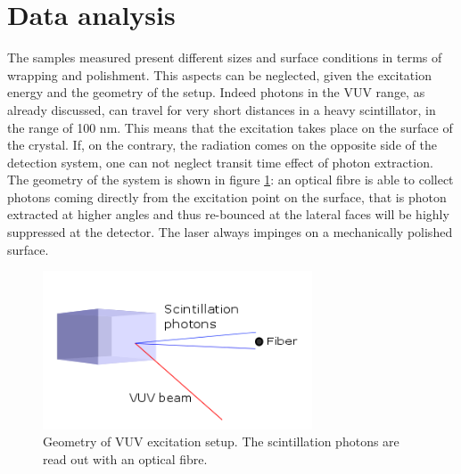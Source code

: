 \section{Data analysis}
The samples measured present different sizes and surface conditions in terms of wrapping and polishment.
This aspects can be neglected, given the excitation energy and the geometry of the setup.
Indeed photons in the VUV range, as already discussed, can travel for very short distances in a heavy scintillator, in the range of 100 nm. This means that the excitation takes place on the surface of the crystal. If, on the contrary, the radiation comes on the opposite side of the detection system, one can not neglect transit time effect of photon extraction. The geometry of the system is shown in figure \ref{fig:geom}: an optical fibre is able to collect photons coming directly from the excitation point on the surface, that is photon extracted at higher angles and thus re-bounced at the lateral faces will be highly suppressed at the detector. The laser always impinges on a mechanically polished surface.
\begin{figure}[htbp]
\begin{center}
\includegraphics[width=8cm]{../Pictures/Chapter_7/disegno_VUV.png}
\end{center}
\caption[Geometry VUV setup]{Geometry of VUV excitation setup. The scintillation photons are read out with an optical fibre.}
\label{fig:geom}
\end{figure}

